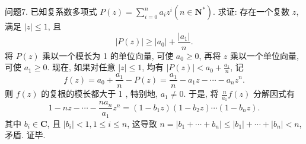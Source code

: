 问题7. 已知复系数多项式 $P(z)=\sum_{i=0}^n a_i z^i\left(n \in \mathbf{N}^*\right)$. 求证: 存在一个复数 $z$, 满足 $|z| \leqslant 1$, 且
$$
|P(z)| \geqslant\left|a_0\right|+\frac{\left|a_1\right|}{n} .
$$
将 $P(z)$ 乘以一个模长为 1 的单位向量, 可使 $a_0 \geqslant 0$, 再将 $z$ 乘以一个单位向量, 可使 $a_1 \geqslant 0$. 现在, 如果对任意 $|z| \leqslant 1$, 均有 $|P(z)|<a_0+\frac{a_1}{n}$, 记
$$
f(z)=a_0+\frac{a_1}{n}-P(z)=\frac{a_1}{n}-a_1 z-\cdots-a_n z^n .
$$
则 $f(z)$ 的复根的模长都大于 1 , 特别地, $a_1 \neq 0$. 于是, 将 $\frac{n}{a_1} f(z)$ 分解因式有
$$
1-n z-\cdots-\frac{n a_n}{a_1} z^n=\left(1-b_1 z\right)\left(1-b_2 z\right) \cdots\left(1-b_n z\right) .
$$
其中 $b_i \in \mathbf{C}$, 且 $\left|b_i\right|<1,1 \leqslant i \leqslant n$, 这导致 $n=\left|b_1+\cdots+b_n\right| \leqslant\left|b_1\right|+\cdots+ \left|b_n\right|<n$, 矛盾.
证毕.


